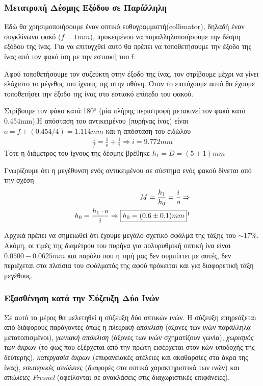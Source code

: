 \documentclass[a4paper]{article}
\begin{document}
		
	\subsubsection*{Μετατροπή Δέσμης Εξόδου σε Παράλληλη}
		Εδώ θα χρησιμοποιήσουμε έναν οπτικό ευθυγραμμιστή(collimator), δηλαδή έναν συγκλίνωνα φακό ($f=1mm$), προκειμένου να παραλληλοποιήσουμε την δέσμη εξόδου της ίνας. Για να επιτυγχθεί αυτό θα πρέπει να τοποθετήσουμε την έξοδο της ίνας από τον φακό ίση με την εστιακή του f. 
		
		Αφού τοποθετήσουμε τον συζεύκτη στην έξοδο της ίνας, τον στρίβουμε μέχρι να γίνει ελάχιστο το μέγεθος του ίχνους της στην οθόνη. Όταν το επιτύχουμε αυτό θα έχουμε τοποθετήσει την έξοδο της ίνας στο εστιακό επίπεδο του φακού.
		
		Στρίβουμε τον φάκο κατά 180$^o$ (μία πλήρης περιστροφή μετακινεί τον φακό κατά 0.454mm).Η απόσταση του αντικειμένου (πυρήνας ίνας) είναι $o = f+(0.454/4 ) =1.114mm$  και η απόσταση του ειδώλου 
		\begin{align*}
			\frac{1}{f} = \frac{1}{o}+\frac{1}{i} \Rightarrow  \boxed{i = 9.772mm}
		\end{align*}
		Τότε η διάμετρος του ίχνους της δέσμης βρέθηκε $h_1=D=(5\pm1)mm$
		
	Γνωρίζουμε ότι η μεγέθυνση ενός αντικειμένου σε σύστημα ενός φακού δίνεται από την σχέση 
		\begin{align*}
			M = \frac{h_1}{h_0}=\frac{i}{o}\Rightarrow \\ 
			 h_0 = \frac{h_1\cdot o}{i} \Rightarrow \boxed{h_0=(0.6\pm 0.1) mm}\footnotemark 
		\end{align*}
		
		Αρχικά πρέπει να σημειωθεί ότι έχουμε μεγάλο σχετικό σφάλμα της τάξης του $\sim 17\%$. Ακόμη, οι τιμές της διαμέτρου του πυρήνα για πολυρυθμική οπτική ίνα είναι $0.0500-0.0625mm$ και παρόλο που η τιμή μας δεν συμπίπτει με αυτές, δεν περιέχεται στα πλαίσια του σφάλματός της αφού πρόκειται και για διαφορετική τάξη μεγέθους. 
		
	\subsubsection*{Εξασθένηση κατά την Σύζευξη Δύο Ινών }
		
		Σε αυτό το μέρος θα μελετηθεί η σύζευξη δύο οπτικών ινών. Η σύζευξη επηρεάζεται από διάφορους παράγοντες όπως η \textit{πλευρική απόκλιση} (άξονες των ινών παράλληλα μετατοπισμένοι), \textit{γωνιακή απόκλιση} (άξονες των ινών σχηματίζουν γωνία), \textit{χωρισμός των άκρων}	(το φως που εξέρχεται από την πρώτη εισέρχεται στον κών υποδοχής της δεύτερης), \textit{κατεργασία άκρων} (επιφανειακές ατέλειες και ακαθαρσίες στα άκρα της ίνας), \textit{εσωτερικές απώλειες} (διαφορές στα οπτικά χαρακτηριστικά των ινών) και \textit{απώλειες Fresnel} (οφείλονται σε ανακλάσεις στις διαχωριστικές επιφάνειες).
		
\end{document}
